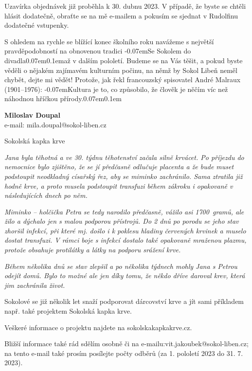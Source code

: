 \documentclass[11pt]{article}
\newcommand{\post}[1]{%
\begin{center}
{\huge \tyrs #1}
\end{center}
}
\newcommand{\signature}[2]{%
  \begin{flushright}
    \textbf{#1}\\#2
  \end{flushright}
}
\newcommand{\luv}{\clqq\kern-0.07em}
\newcommand{\ruv}{\kern0.07em\crqq\kern0.1em}
\begin{document}
Uzavírka objednávek již proběhla k 30. dubnu 2023. V případě, že byste se chtěli hlásit dodatečně, obraťte se na mě e-mailem a pokusím se sjednat v Rudolfinu dodatečné vstupenky.

S ohledem na rychle se blížící konec školního roku navážeme s největší pravděpodobností na obnovenou tradici \luv Se Sokolem do divadla\ruv až v dalším pololetí. Budeme se na Vás těšit, a pokud byste věděli o nějakém zajímavém kulturním počinu, na němž by Sokol Libeň neměl chybět, dejte mi vědět! Protože, jak řekl francouzský spisovatel André Malraux (1901–1976): \luv Kultura je to, co způsobilo, že člověk je něčím víc než náhodnou hříčkou přírody.\ruv
\signature{Miloslav Doupal}{e-mail: mila.doupal@sokol-liben.cz}

\vspace*{24pt}

\post{Sokolská kapka krve}
\textit{Jana byla těhotná a ve 30. týdnu těhotenství začala silně krvácet. Po příjezdu do nemocnice bylo zjištěno, že se jí předčasně odlučuje placenta a že bude muset podstoupit neodkladný císařský řez, aby se miminko zachránilo. Sama ztratila již hodně krve, a proto musela podstoupit transfuzi během zákroku i opakovaně v následujících dnech po něm.} 

\textit{Miminko – holčička Petra se tedy narodilo předčasně, vážilo asi 1700~gramů, ale žilo a dýchalo jen s malou podporou přístrojů. Do 2 dnů po porodu se jeho stav zhoršil infekcí, při které mj. došlo i k poklesu hladiny červených krvinek a muselo dostat transfuzi. V rámci boje s infekcí dostalo také opakovaně mraženou plazmu, protože obsahuje protilátky a látky na podporu srážení krve.}

\textit{Během několika dnů se stav zlepšil a po několika týdnech mohly Jana s Petrou odejít domů. Bylo to možné ale jen díky tomu, že někdo dříve daroval krev, která jim zachránila život.}

\vspace{6pt}

Sokolové se již několik let snaží podporovat dárcovství krve a jít sami příkladem např. také projektem Sokolská kapka krve.

\pagebreak

Veškeré informace o projektu najdete na sokolskakapkakrve.cz.

Bližší informace také rád sdělím osobně či na e-mailu:\newline vit.jakoubek@sokol-liben.cz; na tento e-mail také prosím posílejte počty odběrů (za 1. pololetí 2023 do 31. 7. 2023).
\end{document}
